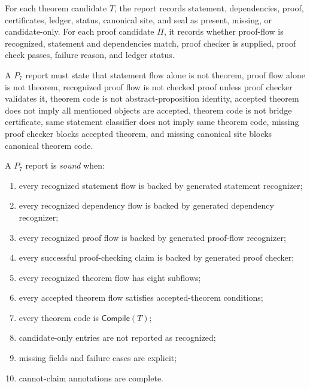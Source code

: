 \begin{definition}
\label{def:theorem-proof-field-proof-status}
For each theorem candidate $T$, the report records statement, dependencies, proof, certificates, ledger, status, canonical site, and seal as present, missing, or candidate-only. For each proof candidate $\Pi$, it records whether proof-flow is recognized, statement and dependencies match, proof checker is supplied, proof check passes, failure reason, and ledger status.
\end{definition}

\begin{definition}
\label{def:theorem-proof-p7-cannot-claims}
A $P_7$ report must state that statement flow alone is not theorem, proof flow alone is not theorem, recognized proof flow is not checked proof unless proof checker validates it, theorem code is not abstract-proposition identity, accepted theorem does not imply all mentioned objects are accepted, theorem code is not bridge certificate, same statement classifier does not imply same theorem code, missing proof checker blocks accepted theorem, and missing canonical site blocks canonical theorem code.
\end{definition}

\begin{definition}
\label{def:theorem-proof-sound-p7-report}
A $P_7$ report is \emph{sound} when:
\begin{enumerate}
\item every recognized statement flow is backed by generated statement recognizer;
\item every recognized dependency flow is backed by generated dependency recognizer;
\item every recognized proof flow is backed by generated proof-flow recognizer;
\item every successful proof-checking claim is backed by generated proof checker;
\item every recognized theorem flow has eight subflows;
\item every accepted theorem flow satisfies accepted-theorem conditions;
\item every theorem code is $\mathsf{Compile}(T)$;
\item candidate-only entries are not reported as recognized;
\item missing fields and failure cases are explicit;
\item cannot-claim annotations are complete.
\end{enumerate}
\end{definition}

